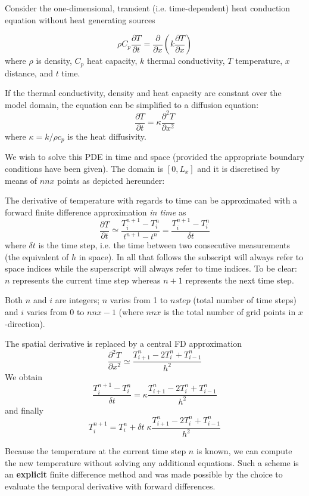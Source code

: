 Consider the one-dimensional, transient (i.e. time-dependent) 
heat conduction equation without heat generating sources

\[
\rho C_p \frac{\partial T}{\partial t} 
= \frac{\partial }{\partial x} \left(  k  \frac{\partial T}{\partial x} \right)
\]
where $\rho$ is density, $C_p$ heat capacity, $k$ thermal conductivity, $T$ temperature, 
$x$ distance, and $t$ time. 

If the thermal conductivity, density and heat capacity are constant over the model domain, 
the equation can be simplified to a diffusion equation:
\[
\frac{\partial T}{\partial t} =  \kappa \frac{\partial^2 T}{\partial x^2} 
\]
where $\kappa=k/\rho c_p$ is the heat diffusivity. 

We wish to solve this PDE in time and space (provided the appropriate 
boundary conditions have been given). The domain is $[0,L_x]$
and it is discretised by means of $nnx$ points as depicted hereunder:

\begin{center}

\end{center}

The derivative of temperature with regards to time can be approximated
with a forward finite difference approximation {\it in time} as
\[
\frac{\partial T}{\partial t} 
\simeq \frac{T_{i}^{n+1}-T_i^n}{t^{n+1}-t^n} 
= \frac{T_{i}^{n+1}-T_i^n}{\delta t} 
\]
where $\delta t$ is the time step, i.e. the time between two consecutive 
measurements (the equivalent of $h$ in space). 
In all that follows the subscript will always refer to space indices 
while the superscript will always refer to time indices.
To be clear: $n$ represents the current time step whereas $n+1$
represents the next time step. 

Both $n$ and $i$ are integers; $n$ varies from 1 to $nstep$ (total number of time steps)
and $i$ varies from 0 to $nnx-1$ (where $nnx$ is the total number of grid points in $x$-direction).

The spatial derivative is replaced by a central FD approximation
\[
\frac{\partial^2 T}{\partial x^2} 
\simeq \frac{T_{i+1}^n - 2T_i^n + T_{i-1}^n}{h^2}
\]
We obtain
\[
\frac{T_{i}^{n+1}-T_i^n}{\delta t} 
= \kappa \frac{T_{i+1}^n - 2T_i^n + T_{i-1}^n}{h^2}
\]
and finally
\[
\boxed{
T_i^{n+1}=T_i^n + \delta t \; \kappa \frac{T_{i+1}^n - 2T_i^n + T_{i-1}^n}{h^2}
}
\]

Because the temperature at the current time step $n$ is known,
we can compute the new temperature without solving any additional equations.
Such a scheme is an {\bf explicit} finite difference method and
was made possible by the choice to evaluate the temporal derivative with forward differences.

